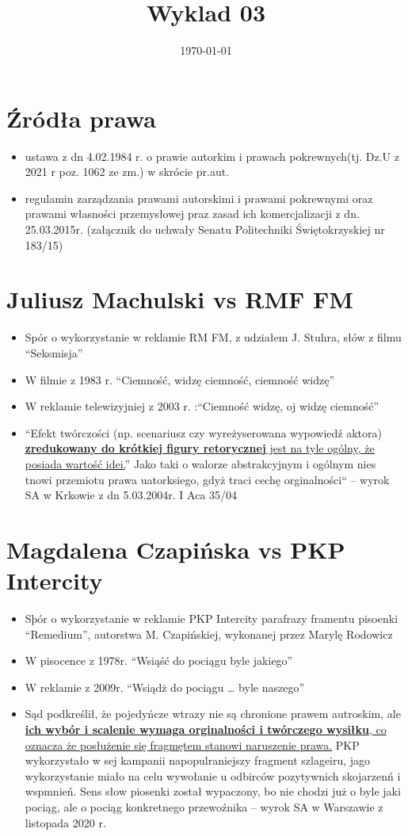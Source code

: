 \documentclass[11pt]{article}
\author{\textcopyleft}
\date{\today}
\title{Wyklad 03}
\begin{document}
\maketitle
\tableofcontents


\section{Źródła prawa}
\label{sec:org74b4051}
\begin{itemize}
\item ustawa z dn 4.02.1984 r. o prawie autorkim i prawach pokrewnych(tj. Dz.U z 2021 r poz. 1062 ze zm.) w skrócie pr.aut.
\item regulamin zarządzania prawami autorskimi i prawami pokrewnymi oraz prawami własności przemysłowej praz zasad ich komercjalizacji z dn. 25.03.2015r. (załącznik do uchwały Senatu Politechniki Świętokrzyskiej nr 183/15)
\end{itemize}
\section{Juliusz Machulski vs RMF FM}
\label{sec:org1ba3a74}
\begin{itemize}
\item Spór o wykorzystanie w reklamie RM FM, z udziałem J. Stuhra, słów z filmu ``Seksmisja''
\item W filmie z 1983 r. ``Ciemność, widzę ciemność, ciemność widzę''
\item W reklamie telewizyjniej z 2003 r. :``Ciemność widzę, oj widzę ciemność''
\item ``Efekt twórczości (np. scenariusz czy wyreżyserowana wypowiedź aktora) \uline{\textbf{zredukowany do krótkiej figury retorycznej} jest na tyle ogólny, że posiada wartość idei.}'' Jako taki o walorze abstrakcyjnym i ogólnym nies tnowi przemiotu prawa uatorksiego, gdyż traci cechę orginalności`` -- wyrok SA w Krkowie z dn 5.03.2004r. I Aca 35/04
\end{itemize}
\section{Magdalena Czapińska vs PKP Intercity}
\label{sec:org78e9372}
\begin{itemize}
\item Sþór o wykorzystanie w reklamie PKP Intercity parafrazy framentu pisoenki ``Remedium'', autorstwa M. Czapińskiej, wykonanej przez Marylę Rodowicz
\item W pisocence z 1978r. ``Wsiąść do pociągu byle jakiego''
\item W reklamie z 2009r. ``Wsiądż do pociągu \ldots{} byle naszego''
\item Sąd podkreślił, że pojedyńcze wtrazy nie są chronione prawem autroskim, ale \uline{\textbf{ich wybór i scalenie wymaga orginalności i twórczego wysiłku}, co oznacza że posłużenie się fragmętem stanowi naruszenie prawa.} PKP wykorzystało w sej kampanii napopulraniejszy fragment szlageiru, jago wykorzystanie miało na celu wywołanie u odbirców pozytywnich skojarzenń i wspmnień. Sens słow piosenki został wypaczony, bo nie chodzi już o byle jaki pociąg, ale o pociąg konkretnego przewoźnika -- wyrok SA w Warszawie z listopada 2020 r.
\end{itemize}
\end{document}

